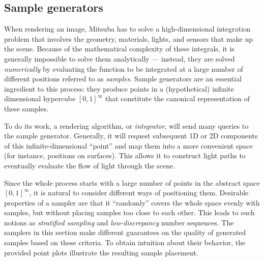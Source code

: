 \newpage
\subsection{Sample generators}
\label{sec:samplers}
When rendering an image, Mitsuba has to solve a high-dimensional integration problem that involves the 
geometry, materials, lights, and sensors that make up the scene. Because of the mathematical complexity 
of these integrals, it is generally impossible to solve them analytically --- instead, they
are solved \emph{numerically} by evaluating the function to be integrated at a large number of 
different positions referred to as \emph{samples}. Sample generators are an essential ingredient to this 
process: they produce points in a (hypothetical) infinite dimensional hypercube $[0,1]^{\infty}$ that 
constitute the canonical representation of these samples.

To do its work, a rendering algorithm, or \emph{integrator}, will send many queries to the sample generator.
Generally, it will request subsequent 1D or 2D components of this infinite-dimensional ``point'' and map 
them into a more convenient space (for instance,  positions on surfaces). This allows it to construct
light paths to eventually evaluate the flow of light through the scene.

Since the whole process starts with a large number of points in the abstract space $[0,1]^{\infty}$,
it is natural to consider different ways of positioning them. Desirable properties of a sampler are
that it ``randomly'' covers the whole space evenly with samples, but without placing samples too close
to each other. This leads to such notions as \emph{stratified sampling} and \emph{low-discrepancy}
number sequences. The samplers in this section make different guarantees on the quality of generated 
samples based on these criteria. To obtain intuition about their behavior, the provided point plots 
illustrate the resulting sample placement.
